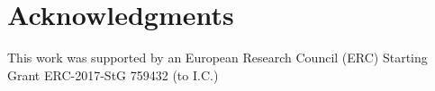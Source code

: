 \documentclass[10pt,letterpaper]{article}
\begin{document}
\section{Acknowledgments}

This work was supported by an European Research Council (ERC) 
Starting Grant ERC-2017-StG 759432 (to I.C.)




\setlength{\bibleftmargin}{.125in}
\setlength{\bibindent}{-\bibleftmargin}


\end{document}
